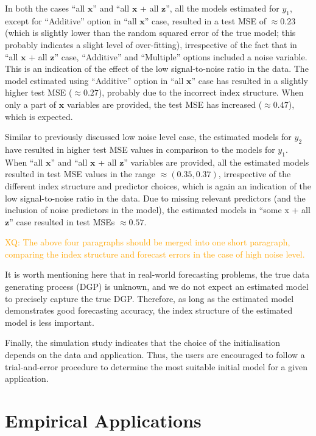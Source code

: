 \documentclass[11pt,a4paper,]{article}
\begin{document}
In both the cases ``all \(\bm{x}\)'' and ``all \(\bm{x}\) + all
\(\bm{z}\)'', all the models estimated for \(y_{1}\), except for
``Additive'' option in ``all \(\bm{x}\)'' case, resulted in a test MSE
of \(\approx 0.23\) (which is slightly lower than the random squared
error of the true model; this probably indicates a slight level of
over-fitting), irrespective of the fact that in ``all \(\bm{x}\) + all
\(\bm{z}\)'' case, ``Additive'' and ``Multiple'' options included a
noise variable. This is an indication of the effect of the low
signal-to-noise ratio in the data. The model estimated using
``Additive'' option in ``all \(\bm{x}\)'' case has resulted in a
slightly higher test MSE (\(\approx 0.27\)), probably due to the
incorrect index structure. When only a part of \(\bm{x}\) variables are
provided, the test MSE has increased (\(\approx 0.47\)), which is
expected.

Similar to previously discussed low noise level case, the estimated
models for \(y_{2}\) have resulted in higher test MSE values in
comparison to the models for \(y_{1}\). When ``all \(\bm{x}\)'' and
``all \(\bm{x}\) + all \(\bm{z}\)'' variables are provided, all the
estimated models resulted in test MSE values in the range
\(\approx (0.35, 0.37)\), irrespective of the different index structure
and predictor choices, which is again an indication of the low
signal-to-noise ratio in the data. Due to missing relevant predictors
(and the inclusion of noise predictors in the model), the estimated
models in ``some x + all \(\bm{z}\)'' case resulted in test MSEs
\(\approx 0.57\).

\textcolor{orange}{XQ: The above four paragraphs should be merged into one short paragraph, comparing the index structure and forecast errors in the case of high noise level.}

It is worth mentioning here that in real-world forecasting problems, the
true data generating process (DGP) is unknown, and we do not expect an
estimated model to precisely capture the true DGP. Therefore, as long as
the estimated model demonstrates good forecasting accuracy, the index
structure of the estimated model is less important.

Finally, the simulation study indicates that the choice of the
initialisation depends on the data and application. Thus, the users are
encouraged to follow a trial-and-error procedure to determine the most
suitable initial model for a given application.

\hypertarget{sec-application}{%
\section{Empirical Applications}\label{sec-application}}
\end{document}
